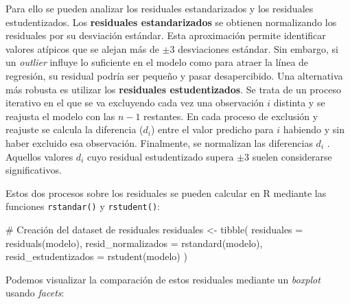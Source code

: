 \documentclass[
  spanish,
  a4paper,
]{scrbook}
\newenvironment{Shaded}{\begin{snugshade}}{\end{snugshade}}
\newcommand{\AttributeTok}[1]{\textcolor[rgb]{0.40,0.45,0.13}{#1}}
\newcommand{\CommentTok}[1]{\textcolor[rgb]{0.37,0.37,0.37}{#1}}
\newcommand{\FunctionTok}[1]{\textcolor[rgb]{0.28,0.35,0.67}{#1}}
\newcommand{\NormalTok}[1]{\textcolor[rgb]{0.00,0.23,0.31}{#1}}
\newcommand{\OtherTok}[1]{\textcolor[rgb]{0.00,0.23,0.31}{#1}}
\begin{document}
Para ello se pueden analizar los residuales estandarizados y los
residuales estudentizados. Los \textbf{residuales estandarizados} se
obtienen normalizando los residuales por su desviación estándar. Esta
aproximación permite identificar valores atípicos que se alejan más de
\(\pm3\) desviaciones estándar. Sin embargo, si un \emph{outlier}
influye lo suficiente en el modelo como para atraer la línea de
regresión, su residual podría ser pequeño y pasar desapercibido. Una
alternativa más robusta es utilizar los \textbf{residuales
estudentizados}. Se trata de un proceso iterativo en el que se va
excluyendo cada vez una observación \(i\) distinta y se reajusta el
modelo con las \(n-1\) restantes. En cada proceso de exclusión y
reajuste se calcula la diferencia (\(d_i\)) entre el valor predicho para
\(i\) habiendo y sin haber excluido esa observación. Finalmente, se
normalizan las diferencias \(d_i\) . Aquellos valores \(d_i\) cuyo
residual estudentizado supera \(\pm 3\) suelen considerarse
significativos.

Estos dos procesos sobre los residuales se pueden calcular en R mediante
las funciones \texttt{rstandar()} y \texttt{rstudent()}:

\begin{Shaded}
\begin{Highlighting}[]
\CommentTok{\# Creación del dataset de residuales}
\NormalTok{residuales }\OtherTok{\textless{}{-}} \FunctionTok{tibble}\NormalTok{(}
  \AttributeTok{residuales =} \FunctionTok{residuals}\NormalTok{(modelo),}
  \AttributeTok{resid\_normalizados =} \FunctionTok{rstandard}\NormalTok{(modelo),}
  \AttributeTok{resid\_estudentizados =} \FunctionTok{rstudent}\NormalTok{(modelo)}
\NormalTok{)}
\end{Highlighting}
\end{Shaded}

Podemos visualizar la comparación de estos residuales mediante un
\emph{boxplot} usando \emph{facets}:
\end{document}
